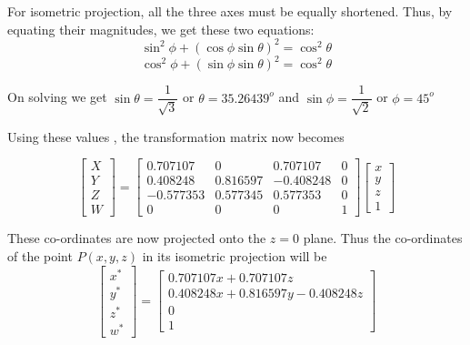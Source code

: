\documentclass[12pt]{article}
\begin{document}
For isometric projection, all the three axes must be equally shortened. Thus, by equating their magnitudes, we get these two equations: 
	\begin{equation}
		\sin^2 \phi + (\cos \phi \sin \theta)^2 = \cos^2 \theta
	\end{equation} 
\begin{equation}
\cos^2 \phi + ( \sin \phi \sin \theta )^2 = \cos^2 \theta
\end{equation}

On solving we get $\sin \theta = \dfrac{1}{\sqrt{3}}$ or $\theta = 35.26439^o$ and $\sin \phi = \dfrac{1}{\sqrt{2}}$ or $\phi = 45^o $

Using these values , the transformation matrix now becomes 

\begin{equation}
    \begin{bmatrix}
	X \\ Y \\ Z \\ W
\end{bmatrix} = 
\begin{bmatrix}
	0.707107 & 0 & 0.707107 & 0 \\
	0.408248 & 0.816597 & -0.408248 & 0 \\
	-0.577353 & 0.577345 & 0.577353 & 0 \\
	0 & 0 & 0 & 1
\end{bmatrix} 
\begin{bmatrix}
	x \\ y \\ z \\ 1
\end{bmatrix}
\end{equation}

These co-ordinates are now projected onto the $z=0$ plane. Thus the co-ordinates of the point $P(x,y,z)$ in its isometric projection will be 
\begin{equation}
    \label{isometric_formula}
    \begin{bmatrix}
	x^* \\ y^* \\ z^* \\ w^*
	\end{bmatrix} = 
	\begin{bmatrix}
	0.707107 x + 0.707107z \\
	0.408248 x + 0.816597 y - 0.408248 z \\
	0 \\ 1
	\end{bmatrix}
\end{equation}
\end{document}
